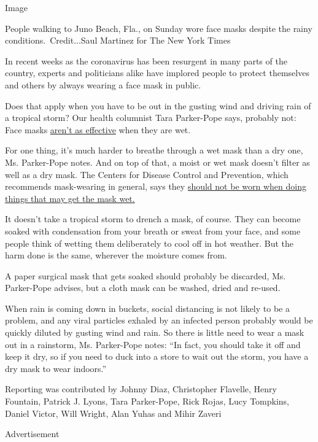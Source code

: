 Image

People walking to Juno Beach, Fla., on Sunday wore face masks despite
the rainy conditions.~Credit...Saul Martinez for The New York Times

In recent weeks as the coronavirus has been resurgent in many parts of
the country, experts and politicians alike have implored people to
protect themselves and others by always wearing a face mask in public.

Does that apply when you have to be out in the gusting wind and driving
rain of a tropical storm? Our health columnist Tara Parker-Pope says,
probably not: Face masks
\href{https://www.nursingtimes.net/clinical-archive/infection-control/the-effectiveness-of-surgical-face-masks-what-the-literature-shows-30-09-2003/}{aren't
as effective} when they are wet.

For one thing, it's much harder to breathe through a wet mask than a dry
one, Ms. Parker-Pope notes. And on top of that, a moist or wet mask
doesn't filter as well as a dry mask. The Centers for Disease Control
and Prevention, which recommends mask-wearing in general, says they
\href{https://www.cdc.gov/coronavirus/2019-ncov/prevent-getting-sick/cloth-face-cover-guidance.html}{should
not be worn when doing things that may get the mask wet.}

It doesn't take a tropical storm to drench a mask, of course. They can
become soaked with condensation from your breath or sweat from your
face, and some people think of wetting them deliberately to cool off in
hot weather. But the harm done is the same, wherever the moisture comes
from.

A paper surgical mask that gets soaked should probably be discarded, Ms.
Parker-Pope advises, but a cloth mask can be washed, dried and re-used.

When rain is coming down in buckets, social distancing is not likely to
be a problem, and any viral particles exhaled by an infected person
probably would be quickly diluted by gusting wind and rain. So there is
little need to wear a mask out in a rainstorm, Ms. Parker-Pope notes:
``In fact, you should take it off and keep it dry, so if you need to
duck into a store to wait out the storm, you have a dry mask to wear
indoors.''

Reporting was contributed by Johnny Diaz, Christopher Flavelle, Henry
Fountain, Patrick J. Lyons, Tara Parker-Pope, Rick Rojas, Lucy Tompkins,
Daniel Victor, Will Wright, Alan Yuhas and Mihir Zaveri

Advertisement

